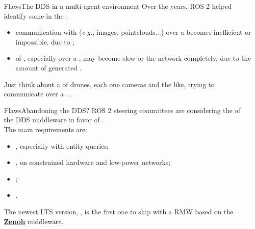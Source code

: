 \begin{frame}{Flaws}{The DDS in a multi-agent environment}
	Over the years, ROS 2 helped identify some  in the :
	\begin{itemize}
		\item communication with  (\emph{e.g.}, images, pointclouds...) over a  becomes inefficient or impossible, due to ;
		\item {} of , especially over a , may become slow or  the network completely, due to the amount of generated .
	\end{itemize}
	Just think about a  of drones, each one cameras and the like, trying to communicate over a ...
\end{frame}
\begin{frame}{Flaws}{Abandoning the DDS?}
  ROS 2 steering committees are considering the  of the DDS middleware in favor of .\\
  The main requirements are:
  \begin{itemize}
    \item {}, especially with entity queries;
    \item {}, on constrained hardware and low-power networks;
    \item {};
    \item {}.
  \end{itemize}
  \bigskip
  The newest LTS version, , is the first one to ship with a RMW based on the \href{https://zenoh.io/}{\color{blue}\textbf{\underline{Zenoh}}} middleware.
\end{frame}

